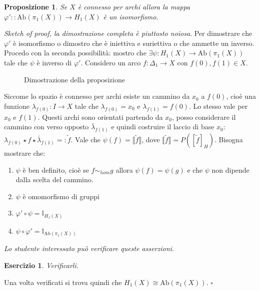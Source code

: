 \documentclass[10pt, twoside=false, x11names]{scrbook}
\newtheorem{proposition}[theorem]{Proposizione}
\newcounter{exercises}
\newtheorem{exercise}[exercises]{Esercizio}
\newenvironment{proof}{{\textbf{Dimostrazione}:}}{\hfill $\square$}
\renewcommand{\phi}{\varphi}
\newcommand{\Id}[1][]{\mathbb{I}_#1}
\newcommand{\Ab}[1]{\mathrm{Ab}\left( #1 \right)}
\begin{document}
\begin{proposition}
  Se $ X $ è connesso per archi allora la mappa $ \phi': \colon \Ab{\pi_1(X)} \to H_1(X) $
  è un isomorfismo.
\end{proposition}
\begin{proof}
  \emph{Sketch of proof, la dimostrazione completa è piuttosto noiosa}.
  Per dimostrare che $ \phi' $ è isomorfismo o dimostro che è iniettiva e suriettiva
  o che ammette un inverso. Procedo con la seconda possibilità: mostro che
  $ \exists \psi \colon H_1(X) \to \Ab{\pi_1(X)} $ tale che $ \psi $ è inverso di $ \phi' $.
  Considero un arco $ f \colon \Delta_1 \to X $ con $ f(0), f(1) \in X $.
  \begin{figure}[htbp]
    \centering
    \caption{Dimostrazione della proposizione}
    \label{fig:lez3:sketch_of_proof}
  \end{figure}
  Siccome lo spazio è connesso per archi esiste un cammino da $ x_0 $ a $ f(0) $, cioè
  una funzione $ \lambda_{f(0)} \colon I \to X $ tale che $ \lambda_{f(0)} = x_0 $ e $ \lambda_{f(1)} = f(0) $.
  Lo stesso vale per $ x_0 $ e $ f(1) $. Questi archi sono orientati partendo da $ x_0 $, posso
  considerare il cammino con verso opposto $ \bar{\lambda}_{f(1)} $ e quindi costruire il laccio
  di base $ x_0 $: $ \lambda_{f(0)} \star f \star \bar{\lambda}_{f(1)} =: \tilde{f} $. Vale che $
  \psi(f) = \llbracket \tilde{f} \rrbracket $,
  dove $  \llbracket \tilde{f} \rrbracket = P \left([\tilde{f}]_H\right)$.
  Bisogna mostrare che:
  \begin{enumerate}
  \item $ \psi $ è ben definito, cioè se $ f \sim_{hom} g $ allora $ \psi(f) = \psi(g) $ e che $ \psi $
    non dipende dalla scelta del cammino.
  \item $ \psi $ è omomorfismo di gruppi
  \item $ \phi' \circ \psi = \Id{H_1(X)} $
  \item $ \psi \circ \phi' = \Id{\Ab{\pi_1(X)}} $
  \end{enumerate}
  \emph{Lo studente interessato può verificare queste asserzioni.}
  \begin{exercise}
    Verificarli.
  \end{exercise}
  Una volta verificati si trova quindi che $ H_1(X) \cong \Ab{\pi_1(X)} $.
\end{proof}
\end{document}

